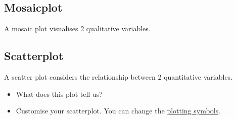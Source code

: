 \documentclass[]{article}
\newenvironment{Shaded}{\begin{snugshade}}{\end{snugshade}}
\newcommand{\CommentTok}[1]{\textcolor[rgb]{0.56,0.35,0.01}{\textit{#1}}}
\newcommand{\DataTypeTok}[1]{\textcolor[rgb]{0.13,0.29,0.53}{#1}}
\newcommand{\DecValTok}[1]{\textcolor[rgb]{0.00,0.00,0.81}{#1}}
\newcommand{\KeywordTok}[1]{\textcolor[rgb]{0.13,0.29,0.53}{\textbf{#1}}}
\newcommand{\NormalTok}[1]{#1}
\newcommand{\OperatorTok}[1]{\textcolor[rgb]{0.81,0.36,0.00}{\textbf{#1}}}
\newcommand{\StringTok}[1]{\textcolor[rgb]{0.31,0.60,0.02}{#1}}
\providecommand{\tightlist}{%
  \setlength{\itemsep}{0pt}\setlength{\parskip}{0pt}}
\begin{document}
\hypertarget{mosaicplot}{%
\subsection{Mosaicplot}\label{mosaicplot}}

A mosaic plot visualises 2 qualitative variables.

\begin{Shaded}
\end{Shaded}

\hypertarget{scatterplot}{%
\subsection{Scatterplot}\label{scatterplot}}

A scatter plot considers the relationship between 2 quantitative variables.

\begin{itemize}
\tightlist
\item
  What does this plot tell us?
\end{itemize}

\begin{Shaded}
\end{Shaded}

\begin{itemize}
\tightlist
\item
  Customise your scatterplot.
  You can change the \href{http://www.statmethods.net/advgraphs/parameters.html}{plotting symbols}.
\end{itemize}

\begin{Shaded}
\end{Shaded}
\end{document}
